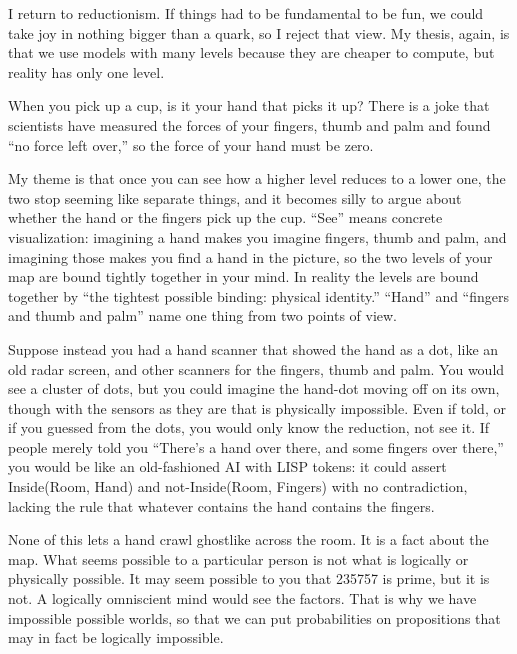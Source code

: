 
I return to reductionism. If things had to be fundamental to be fun, we could take joy in nothing bigger than a quark, so I reject that view. My thesis, again, is that we use models with many levels because they are cheaper to compute, but reality has only one level.

When you pick up a cup, is it your hand that picks it up? There is a joke that scientists have measured the forces of your fingers, thumb and palm and found ``no force left over,'' so the force of your hand must be zero. 

My theme is that once you can see how a higher level reduces to a lower one, the two stop seeming like separate things, and it becomes silly to argue about whether the hand or the fingers pick up the cup. ``See'' means concrete visualization: imagining a hand makes you imagine fingers, thumb and palm, and imagining those makes you find a hand in the picture, so the two levels of your map are bound tightly together in your mind. In reality the levels are bound together by ``the tightest possible binding: physical identity.'' ``Hand'' and ``fingers and thumb and palm'' name one thing from two points of view. 

Suppose instead you had a hand scanner that showed the hand as a dot, like an old radar screen, and other scanners for the fingers, thumb and palm. You would see a cluster of dots, but you could imagine the hand-dot moving off on its own, though with the sensors as they are that is physically impossible. Even if told, or if you guessed from the dots, you would only know the reduction, not see it. If people merely told you ``There's a hand over there, and some fingers over there,'' you would be like an old-fashioned AI with LISP tokens: it could assert Inside(Room, Hand) and not-Inside(Room, Fingers) with no contradiction, lacking the rule that whatever contains the hand contains the fingers.

None of this lets a hand crawl ghostlike across the room. It is a fact about the map. What seems possible to a particular person is not what is logically or physically possible. It may seem possible to you that 235757 is prime, but it is not. A logically omniscient mind would see the factors. That is why we have impossible possible worlds, so that we can put probabilities on propositions that may in fact be logically impossible. 

